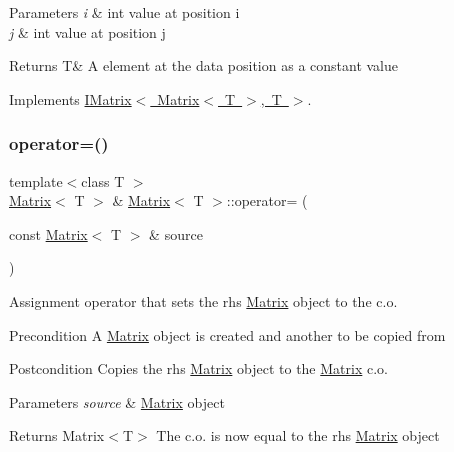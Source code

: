 \begin{DoxyParams}{Parameters}
{\em i} & int value at position i \\
\hline
{\em j} & int value at position j \\
\hline
\end{DoxyParams}
\begin{DoxyReturn}{Returns}
T\& A element at the data position as a constant value 
\end{DoxyReturn}


Implements \mbox{\hyperlink{class_i_matrix_a2abf1a0d2454051da3ccf9cacf12797e}{I\+Matrix$<$ Matrix$<$ T $>$, T $>$}}.

\mbox{\label{class_matrix_a33c00fb6f2e9401d17d9ed615b965634}} 
\subsubsection{\texorpdfstring{operator=()}{operator=()}}
{\footnotesize\ttfamily template$<$class T $>$ \\
\mbox{\hyperlink{class_matrix}{Matrix}}$<$ T $>$ \& \mbox{\hyperlink{class_matrix}{Matrix}}$<$ T $>$\+::operator= (\begin{DoxyParamCaption}\item[{const \mbox{\hyperlink{class_matrix}{Matrix}}$<$ T $>$ \&}]{source }\end{DoxyParamCaption})\hspace{0.3cm}{\ttfamily [virtual]}}



Assignment operator that sets the rhs \mbox{\hyperlink{class_matrix}{Matrix}} object to the c.\+o. 

\begin{DoxyPrecond}{Precondition}
A \mbox{\hyperlink{class_matrix}{Matrix}} object is created and another to be copied from 
\end{DoxyPrecond}
\begin{DoxyPostcond}{Postcondition}
Copies the rhs \mbox{\hyperlink{class_matrix}{Matrix}} object to the \mbox{\hyperlink{class_matrix}{Matrix}} c.\+o. 
\end{DoxyPostcond}

\begin{DoxyParams}{Parameters}
{\em source} & \mbox{\hyperlink{class_matrix}{Matrix}} object \\
\hline
\end{DoxyParams}
\begin{DoxyReturn}{Returns}
Matrix$<$\+T$>$ The c.\+o. is now equal to the rhs \mbox{\hyperlink{class_matrix}{Matrix}} object 
\end{DoxyReturn}


